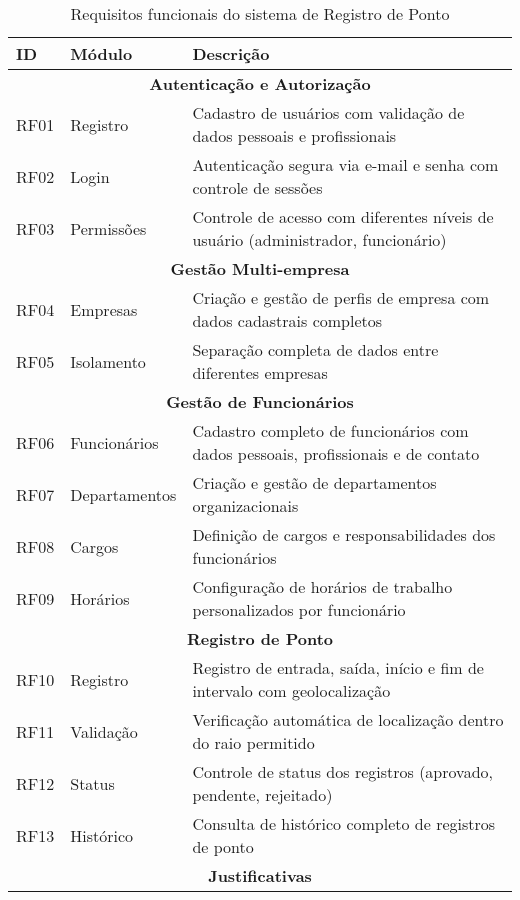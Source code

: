 \begin{table}[!htbp]
\centering
\small
\caption{Requisitos funcionais do sistema de Registro de Ponto}
\label{tab:requisitos-funcionais}
\begin{tabular}{|p{}|p{}|p{}|}
\hline
\textbf{ID} & \textbf{Módulo} & \textbf{Descrição} \\
\hline
\multicolumn{3}{|c|}{\textbf{Autenticação e Autorização}} \\
\hline
RF01 & Registro & Cadastro de usuários com validação de dados pessoais e profissionais \\
\hline
RF02 & Login & Autenticação segura via e-mail e senha com controle de sessões \\
\hline
RF03 & Permissões & Controle de acesso com diferentes níveis de usuário (administrador, funcionário) \\
\hline
\multicolumn{3}{|c|}{\textbf{Gestão Multi-empresa}} \\
\hline
RF04 & Empresas & Criação e gestão de perfis de empresa com dados cadastrais completos \\
\hline
RF05 & Isolamento & Separação completa de dados entre diferentes empresas \\
\hline
\multicolumn{3}{|c|}{\textbf{Gestão de Funcionários}} \\
\hline
RF06 & Funcionários & Cadastro completo de funcionários com dados pessoais, profissionais e de contato \\
\hline
RF07 & Departamentos & Criação e gestão de departamentos organizacionais \\
\hline
RF08 & Cargos & Definição de cargos e responsabilidades dos funcionários \\
\hline
RF09 & Horários & Configuração de horários de trabalho personalizados por funcionário \\
\hline
\multicolumn{3}{|c|}{\textbf{Registro de Ponto}} \\
\hline
RF10 & Registro & Registro de entrada, saída, início e fim de intervalo com geolocalização \\
\hline
RF11 & Validação & Verificação automática de localização dentro do raio permitido \\
\hline
RF12 & Status & Controle de status dos registros (aprovado, pendente, rejeitado) \\
\hline
RF13 & Histórico & Consulta de histórico completo de registros de ponto \\
\hline
\multicolumn{3}{|c|}{\textbf{Justificativas}} \\

\end{tabular}
\end{table}
